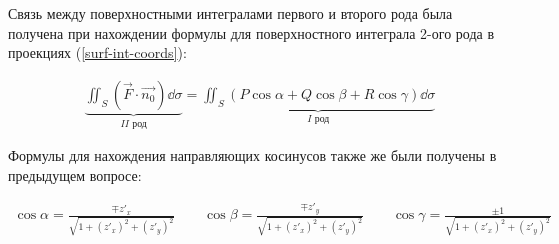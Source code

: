
Связь между поверхностными интегралами первого и второго рода была получена
при нахождении формулы для поверхностного интеграла 2-ого рода в проекциях
(\ref{surf-int-coords}):

\begin{align*}
  \underbrace{
    \iint_{S} (\vec{F} \cdot \vec{n_{0}}) \dd \sigma
  }_{II \text{ род}}
  = \underbrace{
    \iint_{S} (P \cos \alpha + Q \cos \beta + R \cos \gamma) \dd \sigma
  }_{I \text{ род}}
\end{align*}

Формулы для нахождения направляющих косинусов также же были получены в
предыдущем вопросе:

\begin{align*}\label{eq:surf-angles}\tag{ANG}
  \cos \alpha = \frac{\mp z'_{x}}{\sqrt{1 + (z'_{x})^2 + (z'_{y})^2}}
  \qquad
  \cos \beta= \frac{\mp z'_{y}}{\sqrt{1 + (z'_{x})^2 + (z'_{y})^2}}
  \qquad
  \cos \gamma = \frac{\pm 1}{\sqrt{1 + (z'_{x})^2 + (z'_{y})^2}}
\end{align*}

